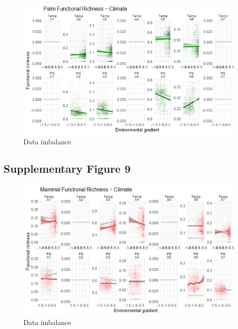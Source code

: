 \documentclass[
]{agujournal2019}
\begin{document}
\begin{figure}[H]

{\centering \includegraphics[width=5.67708in,height=\textheight,keepaspectratio]{sup_figures/palm_FR_detail.jpg}

}

\caption{Data imbalance}

\end{figure}%

\subsection{Supplementary Figure 9}

\begin{figure}[H]

{\centering \includegraphics[width=5.67708in,height=\textheight,keepaspectratio]{sup_figures/mammal_FR_detail.jpg}

}

\caption{Data imbalance}

\end{figure}%
\end{document}
